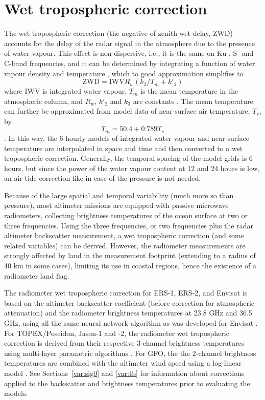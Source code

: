 \documentclass[a4paper,11pt,openany,natbib,nomargin]{thesis}
\begin{document}
\section{Wet tropospheric correction}
\label{var:wet_tropo}
The wet tropospheric correction (the negative of zenith wet delay, ZWD) accounts for the delay of the radar signal in the atmosphere due to the presence of water vapour. This effect is non-dispersive, i.e., it is the same on Ku-, S- and C-band frequencies, and it can be determined by integrating a function of water vapour density and temperature \citep[e.g.,][]{askne1987}, which to good approximation simplifies to
$$ \mathrm{ZWD} = \mathrm{IWV} R_w (k_3 / T_m + k'_2) $$
where IWV is integrated water vapour, $T_m$ is the mean temperature in the atmospheric column, and $R_w$, $k'_2$ and $k_3$ are constants \citep{bevis1994}. The mean temperature can further be approximated from model data of near-surface air temperature, $T_s$, by
$$ T_m = 50.4 + 0.789 T_s$$
\citep{mendes2000}. In this way, the 6-hourly models of integrated water vapour and near-surface temperature are interpolated in space and time and then converted to a wet tropospheric correction.
Generally, the temporal spacing of the model grids is 6 hours, but since the power of the water vapour content at 12 and 24 hours is low, an air tide correction like in case of the pressure is not needed.

Because of the large spatial and temporal variability (much more so than pressure), most altimeter missions are equipped with passive microwave radiometers, collecting brightness temperatures of the ocean surface at two or three frequencies. Using the three frequencies, or two frequencies plus the radar altimeter backscatter measurement, a wet tropospheric correction (and some related variables) can be derived. However, the radiometer measurements are strongly affected by land in the measurement footprint (extending to a radius of 40 km in some cases), limiting its use in coastal regions, hence the existence of a radiometer land flag.

The radiometer wet tropospheric correction for ERS-1, ERS-2, and Envisat is based on the altimeter backscatter coefficient (before correction for atmospheric attenuation) and the radiometer brightness temperatures at 23.8 GHz and 36.5 GHz, using all the same neural network algorithm as was developed for Envisat \citep{labroue2003}. For TOPEX/Poseidon, Jason-1 and -2, the radiometer wet tropospheric correction is derived from their respective 3-channel brightness temperatures using multi-layer parametric algorithms  \citep{ruf1995c,dumont2001}. For GFO, the the 2-channel brightness temperatures are combined with the altimeter wind speed using a log-linear model \citep{ruf1996}. See Sections~\ref{var:sig0} and \ref{var:tb} for information about corrections applied to the backscatter and brightness temperatures prior to evaluating the models.
\end{document}
